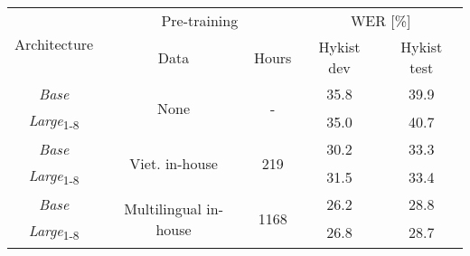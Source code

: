 \begin{table}[!h]
\captionsetup{font=Large}
\centering
\begin{adjustbox}{width=0.8\columnwidth,center}
\begin{tabular}{|c|c|c|c|c|} 
\hline
\multirow{2}{*}{Architecture} & \multicolumn{2}{c|}{Pre-training}                              & \multicolumn{2}{c|}{WER [\%]}  \\ 
\cline{2-5}
                              & Data                                   & Hours                 & Hykist dev & Hykist test       \\ 
\hline
\textit{Base}                 & \multirow{2}{*}{None}                  & \multirow{2}{*}{-}    & 35.8       & 39.9              \\ 
\cline{1-1}\cline{4-5}
\textit{Large}\textsubscript{1-8}             &                                        &                       & 35.0       & 40.7              \\ 
\hline
\textit{Base}                 & \multirow{2}{*}{Viet. in-house}        & \multirow{2}{*}{219}  & 30.2       & 33.3              \\ 
\cline{1-1}\cline{4-5}
\textit{Large}\textsubscript{1-8}             &                                        &                       & 31.5       & 33.4              \\ 
\hline
\textit{Base}                 & \multirow{2}{*}{Multilingual in-house} & \multirow{2}{*}{1168} & 26.2       & 28.8              \\ 
\cline{1-1}\cline{4-5}
\textit{Large}\textsubscript{1-8}             &                                        &                       & 26.8       & 28.7              \\
\hline
\end{tabular}
\end{adjustbox}
\caption{}
\label{table:encoder_compare_pretrain}
\end{table}